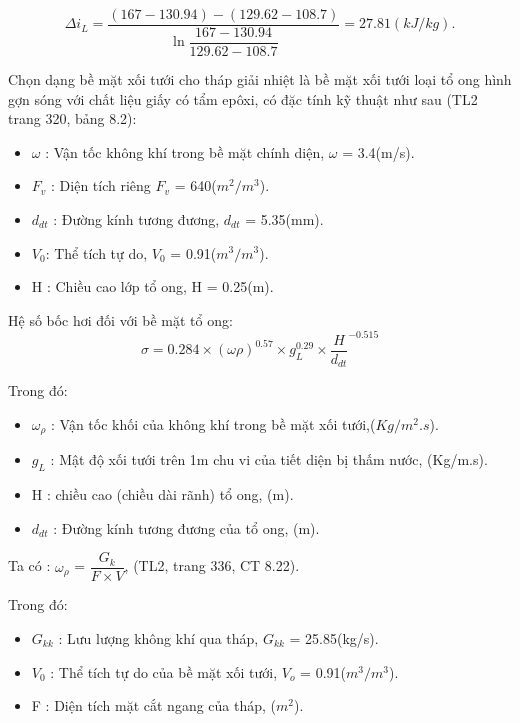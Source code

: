 \begin{equation*}
	\Delta i_{L} = \dfrac{(167-130.94)-(129.62-108.7)}{\ln \dfrac{167-130.94}{129.62-108.7}} = 27.81(kJ/kg).
\end{equation*}

Chọn dạng bề mặt xối tưới cho tháp giải nhiệt là bề mặt xối tưới loại tổ ong hình gợn sóng với chất liệu giấy có tẩm epôxi, có đặc tính kỹ thuật như sau (TL2 trang 320, bảng 8.2):
\begin{itemize}
	\item $\omega$ : Vận tốc không khí trong bề mặt chính diện, $\omega$ = 3.4(m/s).
	\item $F_{v}$ : Diện tích riêng $F_{v}$ = 640($m^2/m^3$).
	\item $d_{dt}$ : Đường kính tương đương, $d_{dt}$ = 5.35(mm).
	\item $V_{0}$: Thể tích tự do, $V_{0}$ = 0.91($m^3/m^3$).
	\item H : Chiều cao lớp tổ ong, H = 0.25(m).
\end{itemize}

Hệ số bốc hơi đối với bề mặt tổ ong:
\begin{equation*}
	\sigma = 0.284 \times (\omega \rho)^{0.57} \times g_{L}^{0.29} \times \dfrac{H}{d_{dt}}^{-0.515}
\end{equation*}

Trong đó:
\begin{itemize}
	\item $\omega_{\rho}$ : Vận tốc khối của không khí trong bề mặt xối tưới,($Kg/m^2.s$).
	\item $g_{L}$ : Mật độ xối tưới trên 1m chu vi của tiết diện bị thấm nước, (Kg/m.s).
	\item H : chiều cao (chiều dài rãnh) tổ ong, (m).
	\item $d_{dt}$ : Đường kính tương đương của tổ ong, (m).
\end{itemize}

Ta có :  $\omega_{\rho}$ = $\dfrac{G_{k}}{F \times V}$, (TL2, trang 336, CT 8.22).

Trong đó:
\begin{itemize}
	\item $G_{kk}$ : Lưu lượng không khí qua tháp, $G_{kk}$ = 25.85(kg/s).
	\item $V_{0}$ : Thể tích tự do của bề mặt xối tưới, $V_{o}$ = 0.91($m^3/m^3$).
	\item F : Diện tích mặt cắt ngang của tháp, ($m^2$).
\end{itemize}

